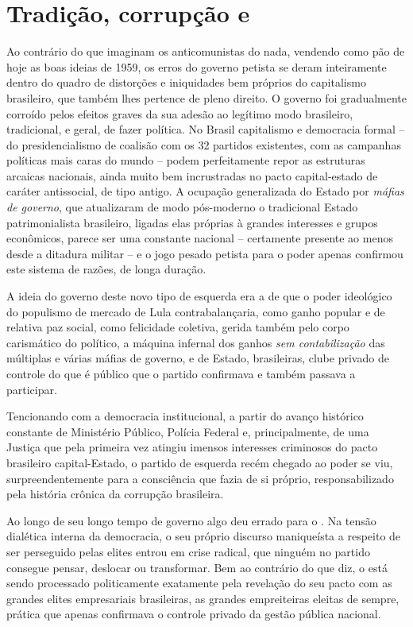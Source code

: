   \section{Tradição, corrupção e
  }\label{tradiuxe7uxe3o-corrupuxe7uxe3o-e-pt}

Ao contrário do que imaginam os anticomunistas do nada, vendendo como
pão de hoje as boas ideias de 1959, os erros do governo petista se deram
inteiramente dentro do quadro de distorções e iniquidades bem próprios
do capitalismo brasileiro, que também lhes pertence de pleno direito. O
governo foi gradualmente corroído pelos efeitos graves da sua adesão ao
legítimo modo brasileiro, tradicional, e geral, de fazer política. No
Brasil capitalismo e democracia formal -- do presidencialismo de
coalisão com os 32 partidos existentes, com as campanhas políticas mais
caras do mundo -- podem perfeitamente repor as estruturas arcaicas
nacionais, ainda muito bem incrustradas no pacto capital-estado de
caráter antissocial, de tipo antigo. A ocupação generalizada do Estado
por \emph{máfias de governo}, que atualizaram de modo pós-moderno o
tradicional Estado patrimonialista brasileiro, ligadas elas próprias à
grandes interesses e grupos econômicos, parece ser uma constante
nacional -- certamente presente ao menos desde a ditadura militar -- e o
jogo pesado petista para o poder apenas confirmou este sistema de
razões, de longa duração.

A ideia do governo deste novo tipo de esquerda era a de que o poder
ideológico do populismo de mercado de Lula contrabalançaria, como ganho
popular e de relativa paz social, como felicidade coletiva, gerida
também pelo corpo carismático do político, a máquina infernal dos ganhos
\emph{sem contabilização} das múltiplas e várias máfias de governo, e de
Estado, brasileiras, clube privado de controle do que é público que o
partido confirmava e também passava a participar.

Tencionando com a democracia institucional, a partir do avanço histórico
constante de Ministério Público, Polícia Federal e, principalmente, de
uma Justiça que pela primeira vez atingiu imensos interesses criminosos
do pacto brasileiro capital-Estado, o partido de esquerda recém chegado
ao poder se viu, surpreendentemente para a consciência que fazia de si
próprio, responsabilizado pela história crônica da corrupção brasileira.

Ao longo de seu longo tempo de governo algo deu errado para o . Na
tensão dialética interna da democracia, o seu próprio discurso
maniqueísta a respeito de ser perseguido pelas elites entrou em crise
radical, que ninguém no partido consegue pensar, deslocar ou
transformar. Bem ao contrário do que diz, o  está sendo processado
politicamente exatamente pela revelação do seu pacto com as grandes
elites empresariais brasileiras, as grandes empreiteiras eleitas de
sempre, prática que apenas confirmava o controle privado da gestão
pública nacional.

